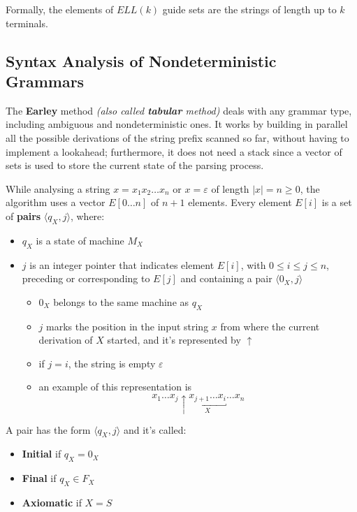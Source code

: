 \documentclass[english]{article}
\begin{document}
Formally, the elements of \(\textit{ELL}(k)\) guide sets are the strings of length up to \(k\) terminals.

\subsection{Syntax Analysis of Nondeterministic Grammars}

The \textbf{Earley} method \textit{(also called \textbf{tabular} method)} deals with any grammar type, including ambiguous and nondeterministic ones.
It works by building in parallel all the possible derivations of the string prefix scanned so far, without having to implement a lookahead;
furthermore, it does not need a stack since a vector of sets is used to store the current state of the parsing process.

\bigskip
While analysing a string \(x = x_1 x_2 \ldots x_n\) or \(x = \varepsilon\) of length \(|x| = n \geq 0\), the algorithm uses a vector \(E\left[ 0 \ldots n \right]\) of \(n+1\) elements.
Every element \(E[i]\) is a set of \textbf{pairs} \(\langle q_X, j\rangle\), where:

\begin{itemize}
  \item \(q_X\) is a state of machine \(M_X\)
  \item \(j\) is an integer pointer that indicates element \(E[i]\), with \(0 \leq i \leq j \leq n\), preceding or corresponding to \(E[j]\) and containing a pair \(\langle 0_X, j \rangle\)
        \begin{itemize}
          \item \(0_X\) belongs to the same machine as \(q_X\)
          \item \(j\) marks the position in the input string \(x\) from where the current derivation of \(X\) started, and it's represented by \(\uparrow\)
          \item if \(j = i\), the string is empty \(\varepsilon\)
          \item an example of this representation is \[ x_1 \ldots x_j \uparrow \underbracket{x_{j+1}\ldots x_i}_{X} \ldots x_n \]
        \end{itemize}
\end{itemize}

\bigskip
A pair has the form \(\langle q_X, j \rangle\) and it's called:
\begin{itemize}
  \item \textbf{Initial} if \(q_X = 0_X\)
  \item \textbf{Final} if \(q_X \in F_X\)
  \item \textbf{Axiomatic} if \(X = S\)
\end{itemize}
\end{document}
